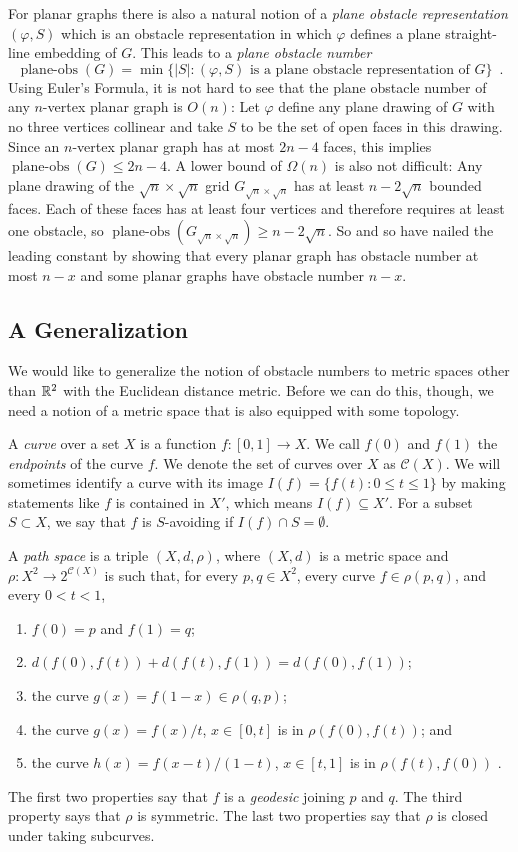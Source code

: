 \documentclass{patmorin}
\DeclareMathOperator{\planeobs}{plane-obs}
\begin{document}
For planar graphs there is also a natural notion of a \emph{plane obstacle
representation} $(\varphi, S)$ which is an obstacle representation
in which $\varphi$ defines a plane straight-line embedding of $G$.
This leads to a \emph{plane obstacle number}
\[
    \planeobs(G) = \min\{|S| :\text{$(\varphi, S)$ is a plane obstacle representation of $G$}\} \enspace .
\]
Using Euler's Formula, it is not hard to see that the plane obstacle
number of any $n$-vertex planar graph is $O(n)$: Let $\varphi$ define
any plane drawing of $G$ with no three vertices collinear and take $S$
to be the set of open faces in this drawing.  Since an $n$-vertex planar
graph has at most $2n-4$ faces, this implies $\planeobs(G)\le 2n-4$.
A lower bound of $\Omega(n)$ is also not difficult:  Any plane drawing
of the $\sqrt{n}\times\sqrt{n}$ grid $G_{\sqrt{n}\times\sqrt{n}}$
has at least $n-2\sqrt{n}$ bounded faces. Each of these faces has
at least four vertices and therefore requires at least one obstacle,
so $\planeobs(G_{\sqrt{n}\times\sqrt{n}})\ge n-2\sqrt{n}$.  So and so
\cite{X} have nailed the leading constant by showing that every planar
graph has obstacle number at most $n-x$ and some planar graphs have
obstacle number $n-x$.

\subsection{A Generalization}

We would like to generalize the notion of obstacle numbers to metric
spaces other than $\mathbb{R}^2$ with the Euclidean distance metric.  Before we
can do this, though, we need a notion of a metric space that is also
equipped with some topology.

A \emph{curve} over a set $X$ is a function $f:[0,1]\to X$.  We call
$f(0)$ and $f(1)$ the \emph{endpoints} of the curve $f$.  We denote the
set of curves over $X$ as $\mathcal{C}(X)$.  We will sometimes identify a
curve with its image $I(f)=\{f(t):0\le t\le 1\}$ by making statements like
$f$ is contained in $X'$, which means $I(f)\subseteq X'$.  For a subset
$S\subset X$, we say that $f$ is $S$-avoiding if $I(f)\cap S=\emptyset$.

A \emph{path space} is a triple $(X,d,\rho)$, where $(X,d)$ is a metric
space and $\rho:X^2\to 2^{\mathcal{C}(X)}$ is such that, for every $p,q\in
X^2$, every curve $f\in \rho(p,q)$, and every $0<t<1$,
\begin{enumerate}
  \item $f(0)=p$ and $f(1)=q$;
  \item $d(f(0),f(t)) + d(f(t),f(1)) = d(f(0),f(1))$; 
  \item the curve $g(x)=f(1-x)\in \rho(q,p)$;
  \item the curve $g(x)=f(x)/t$, $x\in[0,t]$ is in $\rho(f(0),f(t))$; and
  \item the curve $h(x)=f(x-t)/(1-t)$, $x\in[t,1]$ is in $\rho(f(t),f(0))$ \enspace .
\end{enumerate} 
The first two properties say that $f$ is a \emph{geodesic} joining $p$
and $q$.  The third property says that $\rho$ is symmetric. The last
two properties say that $\rho$ is closed under taking subcurves.
\end{document}
